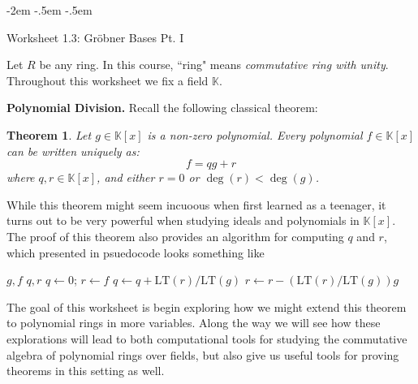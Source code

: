 \documentclass[12pt]{amsart}
\newtheorem{theorem}{Theorem}
\theoremstyle{definition}
\newcommand{\KK}{\mathbb{K}}
\begin{document}
	\thispagestyle{empty}\kern -2em
\kern -.5em
\kern -.5em

\bigskip
	
\begin{center}
	{\Large Worksheet 1.3: Gr\"{o}bner Bases Pt. I}
\end{center}


\medskip

\noindent	 Let $R$ be any ring.  In this course, ``ring" means  {\it commutative ring with unity}. Throughout this worksheet we fix a field $\KK$. 

\medskip

	\noindent	 \hrulefill 
	
\noindent \textbf{Polynomial Division.} Recall the following classical theorem: 

\begin{theorem}\label{thm:division-alg}
Let $g \in \KK[x]$ is a non-zero polynomial. Every polynomial $f\in \KK[x]$ can be written uniquely as:
\[
f=qg+r
\]
where $q,r \in \KK[x]$, and either $r=0$ or $\deg(r) < \deg(g)$. 
\end{theorem}

While this theorem might seem incuoous when first learned as a teenager, it turns out to be very powerful when studying ideals and polynomials in $\KK[x]$. The proof of this theorem also provides an algorithm for computing $q$ and $r$, which presented in psuedocode looks something like

\begin{algorithm}
\caption{Division Algorithm}
\begin{algorithmic}
\Require $g, f$
\Ensure $q, r$
\State $q \gets 0$; $r \gets f$
    \State $q \gets q + \mathrm{LT}(r)/\mathrm{LT}(g)$
    \State $r \gets r - (\mathrm{LT}(r)/\mathrm{LT}(g))g$
\EndWhile
\end{algorithmic}
\end{algorithm}

The goal of this worksheet is begin exploring how we might extend this theorem to polynomial rings in more variables. Along the way we will see how these explorations will lead to both computational tools for studying the commutative algebra of polynomial rings over fields, but also give us useful tools for proving theorems in this setting as well. 
\end{document}
